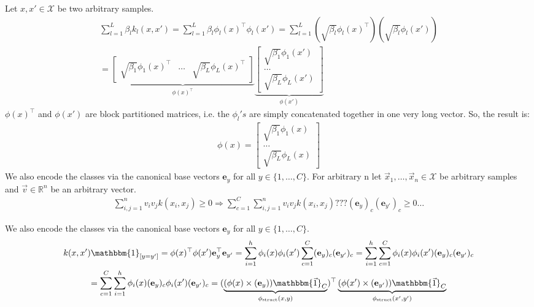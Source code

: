 \documentclass[a4paper]{article}
\newcommand{\e}{\textbf{e}}
\newcommand{\1}{\mathds{1}}
\begin{document}
Let $x,x'\in \mathcal{X}$ be two arbitrary samples.
\begin{gather*}
	\sum_{l=1}^L \beta_l k_l(x,x') 
	= 
	\sum_{l=1}^L \beta_l \phi_l(x)^\top \phi_l(x') 
	=
	\sum_{l=1}^L (\sqrt{\beta_l} \phi_l(x)^\top) (\sqrt{\beta_l} \phi_l(x'))
	\\
	=
\underbrace{
\begin{bmatrix}
	\sqrt{\beta_1} \phi_1(x)^\top	& \dots	& \sqrt{\beta_L} \phi_L(x)^\top      
\end{bmatrix}
}_{\phi(x)^\top}
\underbrace{
\begin{bmatrix}
	\sqrt{\beta_1} \phi_1(x')	\\
	\dots	\\
	\sqrt{\beta_L} \phi_L(x')      
\end{bmatrix}
}_{\phi(x')}
\end{gather*}
$\phi(x)^\top$ and $\phi(x')$ are block partitioned matrices, 
i.e. the $\phi_l's$ are simply concatenated 
together in one very long vector. So, the result is: 
\begin{gather*}
	\phi(x) = 
	\begin{bmatrix}
		\sqrt{\beta_1} \phi_1(x)	\\
		\dots	\\
		\sqrt{\beta_L} \phi_L(x)      
	\end{bmatrix}
\end{gather*}
\newpage 
{}
We also encode the classes via the canonical base vectors 
$\e_y$ for all $y\in \{1,\ldots,C\}$.
For arbitrary n let $\vec{x}_1, \ldots, \vec{x}_n \in \mathcal{X}$ be arbitrary samples 
and $\vec{v}\in\mathbb{R}^n$ be an arbitrary vector.
\begin{gather*}
	\sum_{i,j=1}^n v_i v_j k(x_i,x_j) \geq 0
	\Longrightarrow
	\sum_{c=1}^C \sum_{i,j=1}^n v_i v_j k(x_i,x_j) ??? (\e_y)_c (\e_{y'})_c \geq 0
	\ldots
\end{gather*}

We also encode the classes via the canonical base vectors 
$\e_y$ for all $y\in \{1,\ldots,C\}$.
\begin{gather*}
	k(x,x')\mathbbm{1}_{[y=y']}
	=
	\phi(x)^\top \phi(x') \e^\top_y \e_{y'}
	=
	\sum_{i=1}^h\phi_{i}(x)\phi_{i}(x')\sum_{c=1}^C(\e_y)_c (\e_{y'})_c
	=
	\sum_{i=1}^h\sum_{c=1}^C\phi_{i}(x)\phi_{i}(x') (\e_y)_c (\e_{y'})_c
	\\
	=
	\sum_{c=1}^C \sum_{i=1}^h \phi_{i}(x)(\e_y)_c \phi_{i}(x') (\e_{y'})_c 	
	=
	(
	\underbrace{
		(\phi(x)\times(\e_y))\mathbbm{\vec{1}}_C 
	}_{\phi_{\text{struct}}(x,y)}
	)^\top
	\underbrace{
	(\phi(x')\times(\e_{y'}))\mathbbm{\vec{1}}_C
	}_{\phi_{\text{struct}}(x',y')}
\end{gather*}
\end{document}
